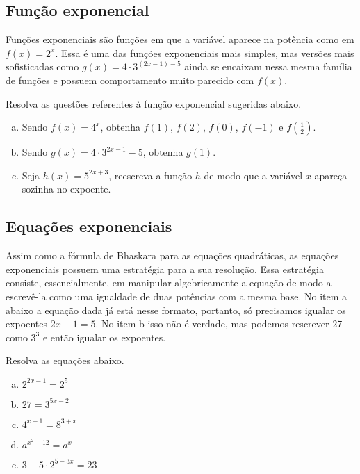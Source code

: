 \documentclass[main_estudante.tex]{subfiles}
\begin{document}
\subsection*{Função exponencial}

Funções exponenciais são funções em que a variável aparece na potência como em $f(x)=2^x$. Essa é uma das funções exponenciais mais simples, mas versões mais sofisticadas como $g(x)=4 \cdot 3^{(2x-1)-5}$ ainda se encaixam nessa mesma família de funções e possuem comportamento muito parecido com $f(x)$.

\begin{questao}
Resolva as questões referentes à função exponencial sugeridas abaixo.
\begin{enumerate}[a)]
\item Sendo $f(x)=4^x$, obtenha $f(1)$, $f(2)$, $f(0)$, $f(-1)$ e $f(\frac{1}{2})$.
\item Sendo $g(x)=4 \cdot 3^{2x-1}-5$, obtenha $g(1)$.
\item Seja $h(x)=5^{2x+3}$, reescreva a função $h$ de modo que a variável $x$ apareça sozinha no expoente.
\end{enumerate}
\end{questao}

\subsection*{Equações exponenciais}

Assim como a fórmula de Bhaskara para as equações quadráticas, as equações exponenciais possuem uma estratégia para a sua resolução. Essa estratégia consiste, essencialmente, em manipular algebricamente a equação de modo a escrevê-la como uma igualdade de duas potências com a mesma base. No item a abaixo a equação dada já está nesse formato, portanto, só precisamos igualar os expoentes $2x-1=5$. No item b isso não é verdade, mas podemos rescrever $27$ como $3^3$ e então igualar os expoentes.

\begin{questao}
Resolva as equações abaixo.
\begin{enumerate}[a)]
\item $2^{2x-1} = 2^5$
\item $27 = 3^{5x-2}$
\item $4^{x+1}=8^{3+x}$
\item $a^{x^2-12}=a^{x}$
\item $3-5 \cdot 2^{5-3x} = 23$
\end{enumerate}
\end{questao}
\end{document}
